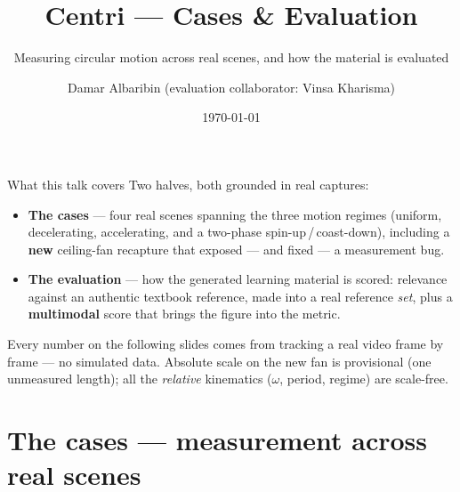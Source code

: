 \documentclass[aspectratio=169,10pt]{beamer}
\title{Centri --- Cases \& Evaluation}
\subtitle{Measuring circular motion across real scenes, and how the material is evaluated}
\author{Damar Albaribin \quad\small (evaluation collaborator: Vinsa Kharisma)}
\institute{MSc Thesis --- advisor: Prof.\ Wu-Yuin Hwang}
\date{\today}
\newcommand{\hl}[1]{{\bfseries\color{cAccent}#1}}
\begin{document}
\maketitle

\begin{frame}{What this talk covers}
\small
Two halves, both grounded in real captures:
\begin{itemize}\setlength\itemsep{3pt}
  \item \textbf{\color{cMeas}The cases} --- four real scenes spanning the three motion regimes
  (uniform, decelerating, accelerating, and a two-phase spin-up\,/\,coast-down), including a
  \hl{new} ceiling-fan recapture that exposed --- and fixed --- a measurement bug.
  \item \textbf{\color{cPed}The evaluation} --- how the generated learning material is scored:
  relevance against an authentic textbook reference, made into a real reference \emph{set}, plus a
  \hl{multimodal} score that brings the figure into the metric.
\end{itemize}
\vspace{0.4em}
{\footnotesize Every number on the following slides comes from tracking a real video frame by frame ---
no simulated data. Absolute scale on the new fan is provisional (one unmeasured length); all the
\emph{relative} kinematics ($\omega$, period, regime) are scale-free.}
\end{frame}

\section{The cases --- measurement across real scenes}
\end{document}
